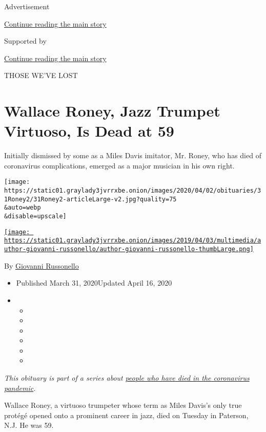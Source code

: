 Advertisement

\protect\hyperlink{after-top}{Continue reading the main story}

Supported by

\protect\hyperlink{after-sponsor}{Continue reading the main story}

THOSE WE'VE LOST

\hypertarget{wallace-roney-jazz-trumpet-virtuoso-is-dead-at-59}{%
\section{Wallace Roney, Jazz Trumpet Virtuoso, Is Dead at
59}\label{wallace-roney-jazz-trumpet-virtuoso-is-dead-at-59}}

Initially dismissed by some as a Miles Davis imitator, Mr. Roney, who
has died of coronavirus complications, emerged as a major musician in
his own right.

\texttt{[image: https://static01.graylady3jvrrxbe.onion/images/2020/04/02/obituaries/31Roney2/31Roney2-articleLarge-v2.jpg?quality=75\\\&auto=webp\\\&disable=upscale]}

\href{https://www.nytimes3xbfgragh.onion/by/giovanni-russonello}{\texttt{[image: https://static01.graylady3jvrrxbe.onion/images/2019/04/03/multimedia/author-giovanni-russonello/author-giovanni-russonello-thumbLarge.png]}}

By
\href{https://www.nytimes3xbfgragh.onion/by/giovanni-russonello}{Giovanni
Russonello}

\begin{itemize}
\item
  Published March 31, 2020Updated April 16, 2020
\item
  \begin{itemize}
  \item
  \item
  \item
  \item
  \item
  \item
  \end{itemize}
\end{itemize}

\emph{This obituary is part of a series about}
\href{https://www.nytimes3xbfgragh.onion/series/people-who-have-died-of-the-coronavirus}{\emph{people
who have died in the coronavirus pandemic}}\emph{.}

Wallace Roney, a virtuoso trumpeter whose term as Miles Davis's only
true protégé opened onto a prominent career in jazz, died on Tuesday in
Paterson, N.J. He was 59.

